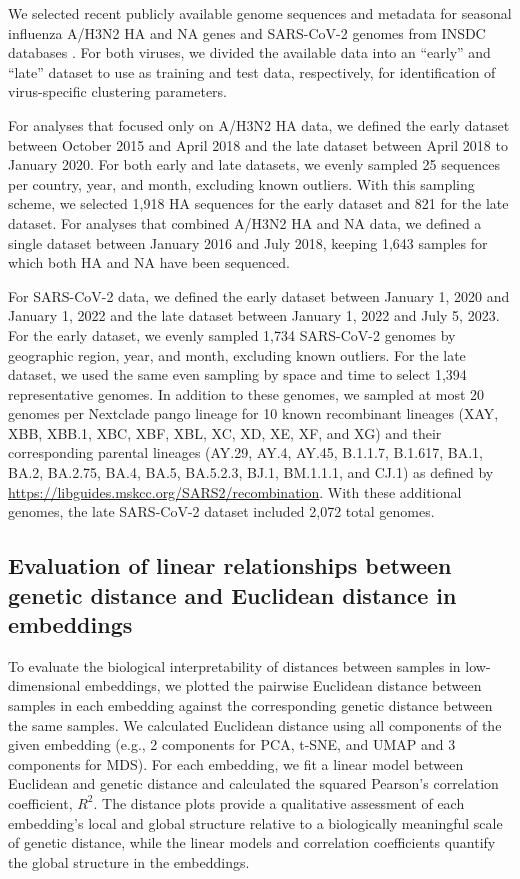 \documentclass[10pt,letterpaper]{article}
\begin{document}
We selected recent publicly available genome sequences and metadata for seasonal influenza A/H3N2 HA and NA genes and SARS-CoV-2 genomes from INSDC databases \cite{Arita2021}.
For both viruses, we divided the available data into an ``early'' and ``late'' dataset to use as training and test data, respectively, for identification of virus-specific clustering parameters.

For analyses that focused only on A/H3N2 HA data, we defined the early dataset between October 2015 and April 2018 and the late dataset between April 2018 to January 2020.
For both early and late datasets, we evenly sampled 25 sequences per country, year, and month, excluding known outliers.
With this sampling scheme, we selected 1,918 HA sequences for the early dataset and 821 for the late dataset.
For analyses that combined A/H3N2 HA and NA data, we defined a single dataset between January 2016 and July 2018, keeping 1,643 samples for which both HA and NA have been sequenced.

For SARS-CoV-2 data, we defined the early dataset between January 1, 2020 and January 1, 2022 and the late dataset between January 1, 2022 and July 5, 2023.
For the early dataset, we evenly sampled 1,734 SARS-CoV-2 genomes by geographic region, year, and month, excluding known outliers.
For the late dataset, we used the same even sampling by space and time to select 1,394 representative genomes.
In addition to these genomes, we sampled at most 20 genomes per Nextclade pango lineage for 10 known recombinant lineages (XAY, XBB, XBB.1, XBC, XBF, XBL, XC, XD, XE, XF, and XG) and their corresponding parental lineages (AY.29, AY.4, AY.45, B.1.1.7, B.1.617, BA.1, BA.2, BA.2.75, BA.4, BA.5, BA.5.2.3, BJ.1, BM.1.1.1, and CJ.1) as defined by \href{https://libguides.mskcc.org/SARS2/recombination}{https://libguides.mskcc.org/SARS2/recombination}.
With these additional genomes, the late SARS-CoV-2 dataset included 2,072 total genomes.

\subsection*{Evaluation of linear relationships between genetic distance and Euclidean distance in embeddings}

To evaluate the biological interpretability of distances between samples in low-dimensional embeddings, we plotted the pairwise Euclidean distance between samples in each embedding against the corresponding genetic distance between the same samples.
We calculated Euclidean distance using all components of the given embedding (e.g., 2 components for PCA, t-SNE, and UMAP and 3 components for MDS).
For each embedding, we fit a linear model between Euclidean and genetic distance and calculated the squared Pearson's correlation coefficient, $R^{2}$.
The distance plots provide a qualitative assessment of each embedding's local and global structure relative to a biologically meaningful scale of genetic distance, while the linear models and correlation coefficients quantify the global structure in the embeddings.
\end{document}

